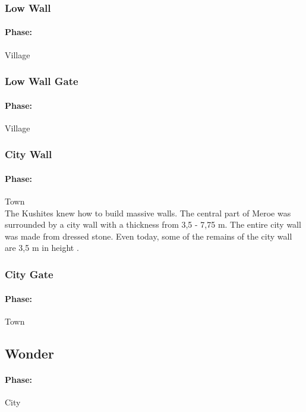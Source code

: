 \documentclass[a4paper,12pt]{scrreprt}
\begin{document}
\subsubsection{Low Wall}

\paragraph{Phase:} Village\\



\subsubsection{Low Wall Gate}

\paragraph{Phase:} Village\\

\subsubsection{City Wall}

\paragraph{Phase:} Town\\

The Kushites knew how to build massive walls. The central part of Meroe was surrounded by a city wall with a thickness from 3,5 - 7,75 m. The entire city wall was made from dressed stone. Even today, some of the remains of the city wall are 3,5 m in height \citep[p. 43]{welsby_kingdom_2005}.

\subsubsection{City Gate}

\paragraph{Phase:} Town\\

\subsection{Wonder}

\paragraph{Phase:} City\\
\end{document}
